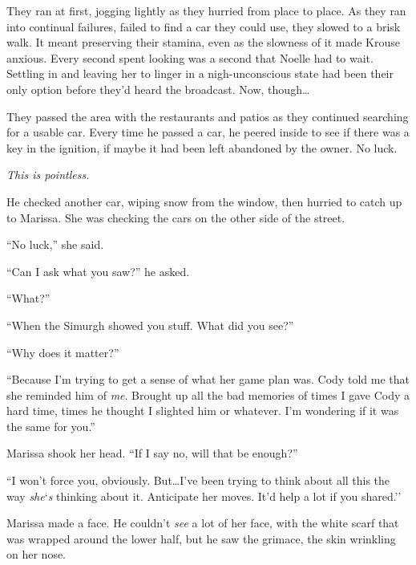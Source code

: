 They ran at first, jogging lightly as they hurried from place to place.  As they ran into continual failures, failed to find a car they could use, they slowed to a brisk walk.  It meant preserving their stamina, even as the slowness of it made Krouse anxious.  Every second spent looking was a second that Noelle had to wait.  Settling in and leaving her to linger in a nigh-unconscious state had been their only option before they'd heard the broadcast.  Now, though\ldots



They passed the area with the restaurants and patios as they continued searching for a usable car.  Every time he passed a car, he peered inside to see if there was a key in the ignition, if maybe it had been left abandoned by the owner.  No luck.



\emph{This is pointless.}



He checked another car, wiping snow from the window, then hurried to catch up to Marissa.  She was checking the cars on the other side of the street.



``No luck,'' she said.



``Can I ask what you saw?'' he asked.



``What?''



``When the Simurgh showed you stuff.  What did you see?''



``Why does it matter?''



``Because I'm trying to get a sense of what her game plan was.  Cody told me that she reminded him of \emph{me}.  Brought up all the bad memories of times I gave Cody a hard time, times he thought I slighted him or whatever.  I'm wondering if it was the same for you.''



Marissa shook her head.  ``If I say no, will that be enough?''



``I won't force you, obviously.  But\ldots I've been trying to think about all this the way \emph{she}`\emph{s} thinking about it.  Anticipate her moves.  It'd help a lot if you shared.''



Marissa made a face.  He couldn't \emph{see} a lot of her face, with the white scarf that was wrapped around the lower half, but he saw the grimace, the skin wrinkling on her nose.



